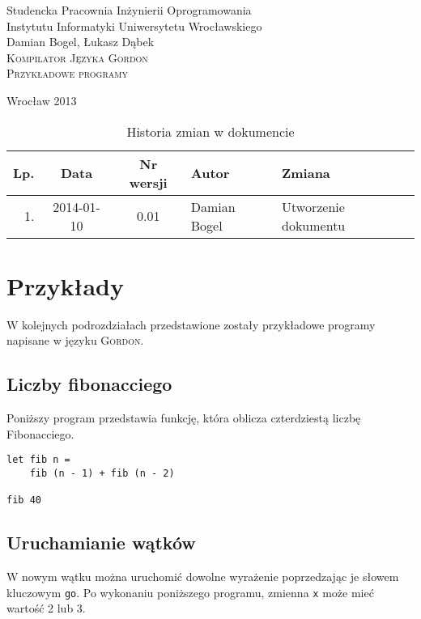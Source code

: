 \documentclass{documentation}
\begin{document}
\begin{titlepage}
\begin{center}
Studencka Pracownia Inżynierii Oprogramowania\\
Instytutu Informatyki Uniwersytetu Wrocławskiego\\[6cm]

Damian Bogel, Łukasz Dąbek\\[1cm]
\textsc{\LARGE Kompilator Języka Gordon}\\[0.5cm]
\textsc{\large Przykładowe programy}

\vfill
Wrocław 2013 \\[2.5cm]

\end{center}
\end{titlepage}

\newpage
\begin{table}
	\centering
    \captionsetup{name=Tabela,labelsep=period}
	\caption{Historia zmian w dokumencie}
		\begin{tabular}{|r|c|c|l|l|}
		\hline
		Lp.  & Data       & Nr wersji & Autor                 & Zmiana \\ \hline
		1.   & 2014-01-10 & 0.01 & Damian Bogel & Utworzenie dokumentu \\ \hline
	\end{tabular}
\end{table}
\newpage

\tableofcontents
\setcounter{page}{2}

\newpage

\section{Przykłady}
\noindent W kolejnych podrozdziałach przedstawione zostały przykładowe programy
napisane w języku \textsc{Gordon}.

\subsection{Liczby fibonacciego}
\noindent Poniższy program przedstawia funkcję, która oblicza czterdziestą
liczbę Fibonacciego.

\begin{verbatim}
let fib n = 
    fib (n - 1) + fib (n - 2)

fib 40
\end{verbatim}

\subsection{Uruchamianie wątków}
\noindent W nowym wątku można uruchomić dowolne wyrażenie poprzedzając je słowem kluczowym
\texttt{go}. Po wykonaniu poniższego programu, zmienna \texttt{x} może mieć wartość 2 lub 3.
\end{document}
